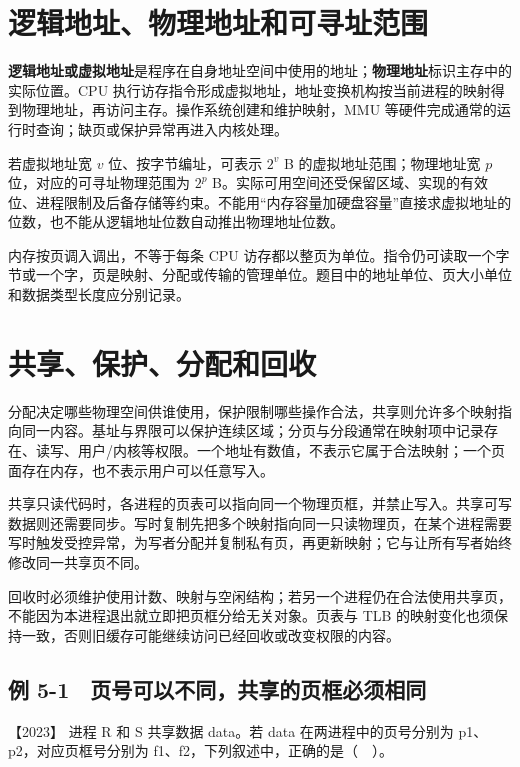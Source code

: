 \section{逻辑地址、物理地址和可寻址范围}\label{os-5-1}

\textbf{逻辑地址或虚拟地址}是程序在自身地址空间中使用的地址；\textbf{物理地址}标识主存中的实际位置。CPU 执行访存指令形成虚拟地址，地址变换机构按当前进程的映射得到物理地址，再访问主存。操作系统创建和维护映射，MMU 等硬件完成通常的运行时查询；缺页或保护异常再进入内核处理。

若虚拟地址宽 \(v\) 位、按字节编址，可表示 \(2^v\) B 的虚拟地址范围；物理地址宽 \(p\) 位，对应的可寻址物理范围为 \(2^p\) B。实际可用空间还受保留区域、实现的有效位、进程限制及后备存储等约束。不能用``内存容量加硬盘容量''直接求虚拟地址的位数，也不能从逻辑地址位数自动推出物理地址位数。

内存按页调入调出，不等于每条 CPU 访存都以整页为单位。指令仍可读取一个字节或一个字，页是映射、分配或传输的管理单位。题目中的地址单位、页大小单位和数据类型长度应分别记录。

\section{共享、保护、分配和回收}\label{os-5-2}

分配决定哪些物理空间供谁使用，保护限制哪些操作合法，共享则允许多个映射指向同一内容。基址与界限可以保护连续区域；分页与分段通常在映射项中记录存在、读写、用户/内核等权限。一个地址有数值，不表示它属于合法映射；一个页面存在内存，也不表示用户可以任意写入。

共享只读代码时，各进程的页表可以指向同一个物理页框，并禁止写入。共享可写数据则还需要同步。写时复制先把多个映射指向同一只读物理页，在某个进程需要写时触发受控异常，为写者分配并复制私有页，再更新映射；它与让所有写者始终修改同一共享页不同。

回收时必须维护使用计数、映射与空闲结构；若另一个进程仍在合法使用共享页，不能因为本进程退出就立即把页框分给无关对象。页表与 TLB 的映射变化也须保持一致，否则旧缓存可能继续访问已经回收或改变权限的内容。

\subsection{例 5-1　页号可以不同，共享的页框必须相同}\label{os-ex5-1}

\noindent{}【2023】 进程 R 和 S 共享数据 data。若 data 在两进程中的页号分别为 p1、p2，对应页框号分别为 f1、f2，下列叙述中，正确的是（　）。


